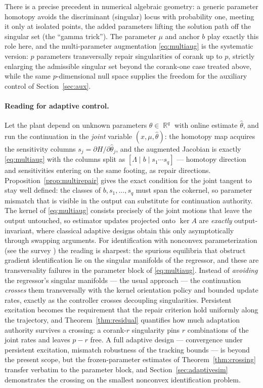 \documentclass[11pt,american]{article}
\DeclareMathOperator{\R}{\mathbb{R}}
\theoremstyle{definition}
\theoremstyle{plain}
\theoremstyle{remark}
\begin{document}
There is a precise precedent in numerical algebraic geometry: a generic parameter homotopy avoids the discriminant (singular) locus with probability one, meeting it only at isolated points, the added parameters lifting the solution path off the singular set (the ``gamma trick''). The parameter $\mu$ and anchor $b$ play exactly this role here, and the multi-parameter augmentation \eqref{eq:multiaug} is the systematic version: $p$ parameters transversally repair singularities of corank up to $p$, strictly enlarging the admissible singular set beyond the corank-one case treated above, while the same $p$-dimensional null space supplies the freedom for the auxiliary control of Section~\ref{sec:aux}.

\paragraph{Reading for adaptive control.} Let the plant depend on unknown parameters $\theta \in \R^q$ with online estimate $\hat\theta$, and run the continuation in the \emph{joint} variable $(x, \mu, \hat\theta)$: the homotopy map acquires the sensitivity columns $s_j = \partial H/\partial\hat\theta_j$, and the augmented Jacobian is exactly \eqref{eq:multiaug} with the columns split as $[\Lambda \mid b \mid s_1 \cdots s_q]$ --- homotopy direction and sensitivities entering on the same footing, as repair directions. Proposition~\ref{prop:multirepair} gives the exact condition for the joint tangent to stay well defined: the classes of $b, s_1, \dots, s_q$ must span the cokernel, so parameter mismatch that is visible in the output can substitute for continuation authority. The kernel of \eqref{eq:multiaug} consists precisely of the joint motions that leave the output untouched, so estimator updates projected onto $\ker A$ are \emph{exactly} output-invariant, where classical adaptive designs obtain this only asymptotically through swapping arguments. For identification with nonconvex parameterization (see the survey \cite{Borisevich2013}) the reading is sharpest: the spurious equilibria that obstruct gradient identification lie on the singular manifolds of the regressor, and these are transversality failures in the parameter block of \eqref{eq:multiaug}. Instead of \emph{avoiding} the regressor's singular manifolds --- the usual approach --- the continuation \emph{crosses} them transversally with the kernel orientation policy and bounded update rates, exactly as the controller crosses decoupling singularities. Persistent excitation becomes the requirement that the repair criterion hold uniformly along the trajectory, and Theorem~\ref{thm:residual} quantifies how much adaptation authority survives a crossing: a corank-$r$ singularity pins $r$ combinations of the joint rates and leaves $p - r$ free. A full adaptive design --- convergence under persistent excitation, mismatch robustness of the tracking bounds --- is beyond the present scope, but the frozen-parameter estimates of Theorem~\ref{thm:crossing} transfer verbatim to the parameter block, and Section~\ref{sec:adaptivesim} demonstrates the crossing on the smallest nonconvex identification problem.
\end{document}
